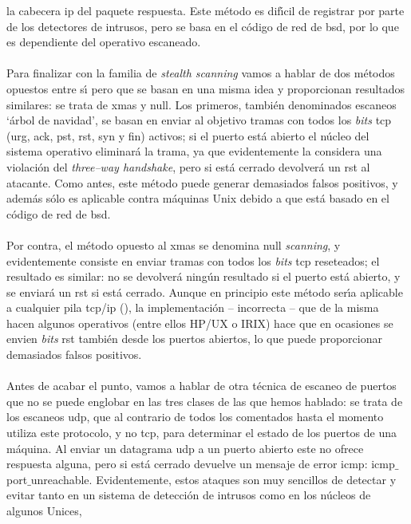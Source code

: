 la cabecera {\sc ip} del paquete respuesta. Este m\'etodo es dif\'{\i}cil de 
registrar por parte de los detectores de intrusos, pero se basa en el c\'odigo
de red de {\sc bsd}, por lo que es dependiente del operativo escaneado.\\
\\Para finalizar con la familia de {\it stealth scanning} vamos a hablar de dos
m\'etodos opuestos entre s\'{\i} pero que se basan en una misma idea y 
proporcionan resultados similares: se trata de {\sc xmas} y {\sc null}. Los 
primeros, tambi\'en denominados escaneos `\'arbol de navidad', se basan en 
enviar al objetivo
tramas con todos los {\it bits} {\sc tcp} ({\sc urg, ack, pst, rst, syn} y {\sc
fin}) activos; si el puerto est\'a abierto el n\'ucleo del sistema operativo
eliminar\'a la trama, ya que evidentemente la considera una violaci\'on del
{\it three--way handshake}, pero si est\'a cerrado devolver\'a un {\sc rst} al
atacante. Como antes, este m\'etodo puede generar demasiados falsos positivos,
y adem\'as s\'olo es aplicable contra m\'aquinas Unix debido a que est\'a
basado en el c\'odigo de red de {\sc bsd}.\\
\\Por contra, el m\'etodo opuesto al {\sc xmas} se denomina {\sc null} {\it 
scanning}, y
evidentemente consiste en enviar tramas con todos los {\it bits} {\sc tcp} 
reseteados; el resultado es similar: no se devolver\'a ning\'un resultado si
el puerto est\'a abierto, y se enviar\'a un {\sc rst} si est\'a cerrado. Aunque
en principio este m\'etodo ser\'{\i}a aplicable a cualquier pila {\sc tcp/ip}
(\cite{kn:ark99}), la implementaci\'on -- incorrecta -- que de la misma hacen 
algunos operativos (entre ellos HP/UX o IRIX) hace que en ocasiones se 
envien {\it bits} {\sc rst} tambi\'en desde los puertos abiertos, lo que 
puede proporcionar demasiados falsos positivos.\\
\\Antes de acabar el punto, vamos a hablar de otra t\'ecnica de escaneo de 
puertos que no se puede englobar en las tres clases de las que hemos hablado:
se trata de los escaneos {\sc udp}, que al contrario de todos los comentados
hasta el momento utiliza este protocolo, y no {\sc tcp}, para determinar el
estado de los puertos de una m\'aquina. Al enviar un datagrama {\sc udp} a un
puerto abierto este no ofrece res\-pues\-ta alguna, pero si est\'a cerrado 
devuelve
un mensaje de error {\sc icmp}: {\sc icmp$\_$port$\_$unreachable}. 
Evidentemente, estos ataques son muy sencillos de detectar y evitar tanto en
un sistema de detecci\'on de intrusos como en los n\'ucleos de algunos Unices, 
